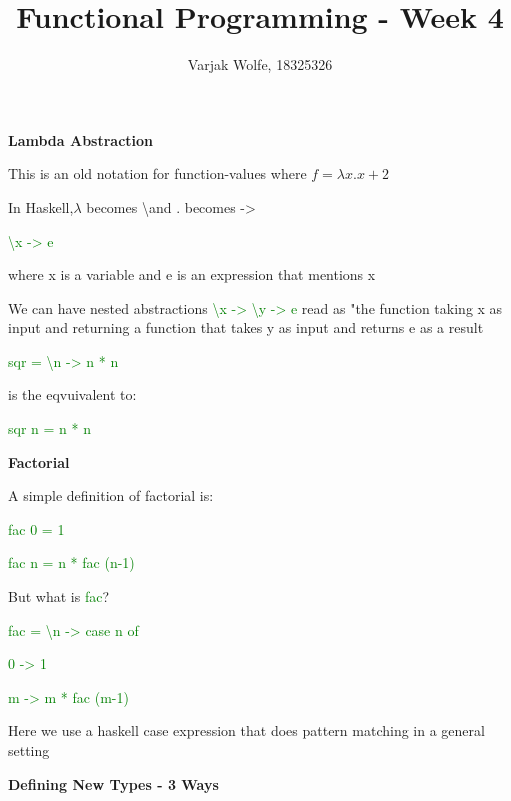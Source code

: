 \documentclass{article}
\title{Functional Programming - Week 4}
\author{Varjak Wolfe, 18325326}
\begin{document}
\textbf{Lambda Abstraction}

This is an old notation for function-values where $f = \lambda x . x + 2$

In Haskell,$\lambda$ becomes \textbackslash and . becomes ->

\textcolor{green}{\textbackslash x -> e}

where x is a variable and e is an expression that mentions x

We can have nested abstractions \textcolor{green}{\textbackslash x -> \textbackslash y -> e} read as "the function taking x as input and returning a function that takes y as input and returns e as a result

\textcolor{green}{sqr = \textbackslash n -> n * n} 

is the eqvuivalent to:

\textcolor{green}{sqr  n = n * n}


\textbf{Factorial}

A simple definition of factorial is:

\textcolor{green}{fac  0 = 1}

\textcolor{green}{fac  n = n * fac  (n-1)}

But what is \textcolor{green}{fac}?

\textcolor{green}{fac = \textbackslash n -> case n of}

\textcolor{green}{0 -> 1}

\textcolor{green}{m -> m * fac  (m-1)}

Here we use a haskell case expression that does pattern matching in a general setting


\textbf{Defining New Types - 3 Ways}
\end{document}
